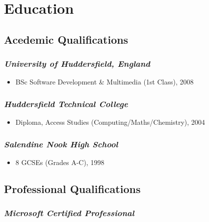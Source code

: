\documentclass{article}
\title{}
\author{Andrew Mcveigh}
\date{}
\begin{document}
\title{\vspace{-10mm}}
\maketitle



\section*{Education}
\label{sec-1}

\subsection*{Acedemic Qualifications}
\label{sec-1.1}

\subsubsection*{\emph{University of Huddersfield, England}}
\label{sec-1.1.1}

\begin{itemize}
\item BSc Software Development \& Multimedia (1st Class), 2008
\end{itemize}
\subsubsection*{\emph{Huddersfield Technical College}}
\label{sec-1.1.2}

\begin{itemize}
\item Diploma, Access Studies (Computing/Maths/Chemistry), 2004
\end{itemize}
\subsubsection*{\emph{Salendine Nook High School}}
\label{sec-1.1.3}

\begin{itemize}
\item 8 GCSEs (Grades A-C), 1998
\end{itemize}
\subsection*{Professional Qualifications}
\label{sec-1.2}

\subsubsection*{\emph{Microsoft Certified Professional}}
\label{sec-1.2.1}
\end{document}
